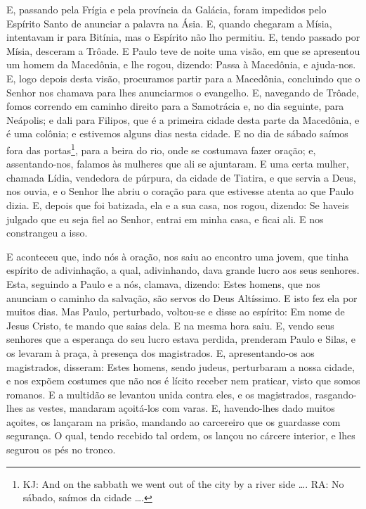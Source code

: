 E, passando pela Frígia e pela província da Galácia, foram
impedidos pelo Espírito Santo de anunciar a palavra na Ásia. E,
quando chegaram a Mísia, intentavam ir para Bitínia, mas o Espírito
não lho permitiu. E, tendo passado por Mísia, desceram a Trôade.
E Paulo teve de noite uma visão, em que se apresentou um homem
da Macedônia, e lhe rogou, dizendo: Passa à Macedônia, e ajuda-nos.
E, logo depois desta visão, procuramos partir para a
Macedônia, concluindo que o Senhor nos chamava para lhes anunciarmos
o evangelho. E, navegando de Trôade, fomos correndo em
caminho direito para a Samotrácia e, no dia seguinte, para Neápolis;
e dali para Filipos, que é a primeira cidade desta parte da
Macedônia, e é uma colônia; e estivemos alguns dias nesta cidade.
E no dia de sábado saímos fora das portas\footnote{KJ: And on
the sabbath we went out of the city by a river side \ldots{}. RA: No
sábado, saímos da cidade \ldots{}.}, para a beira do rio, onde se
costumava fazer oração; e, assentando-nos, falamos às mulheres que
ali se ajuntaram. E uma certa mulher, chamada Lídia,
vendedora de púrpura, da cidade de Tiatira, e que servia a Deus, nos
ouvia, e o Senhor lhe abriu o coração para que estivesse atenta ao
que Paulo dizia. E, depois que foi batizada, ela e a sua
casa, nos rogou, dizendo: Se haveis julgado que eu seja fiel ao
Senhor, entrai em minha casa, e ficai ali. E nos constrangeu a isso.

E aconteceu que, indo nós à oração, nos saiu ao encontro uma
jovem, que tinha espírito de adivinhação, a qual, adivinhando, dava
grande lucro aos seus senhores. Esta, seguindo a Paulo e a
nós, clamava, dizendo: Estes homens, que nos anunciam o caminho da
salvação, são servos do Deus Altíssimo. E isto fez ela por
muitos dias. Mas Paulo, perturbado, voltou-se e disse ao espírito:
Em nome de Jesus Cristo, te mando que saias dela. E na mesma hora
saiu. E, vendo seus senhores que a esperança do seu lucro
estava perdida, prenderam Paulo e Silas, e os levaram à praça, à
presença dos magistrados. E, apresentando-os aos magistrados,
disseram: Estes homens, sendo judeus, perturbaram a nossa cidade,
e nos expõem costumes que não nos é lícito receber nem
praticar, visto que somos romanos. E a multidão se levantou
unida contra eles, e os magistrados, rasgando-lhes as vestes,
mandaram açoitá-los com varas. E, havendo-lhes dado muitos
açoites, os lançaram na prisão, mandando ao carcereiro que os
guardasse com segurança. O qual, tendo recebido tal ordem, os
lançou no cárcere interior, e lhes segurou os pés no tronco.

